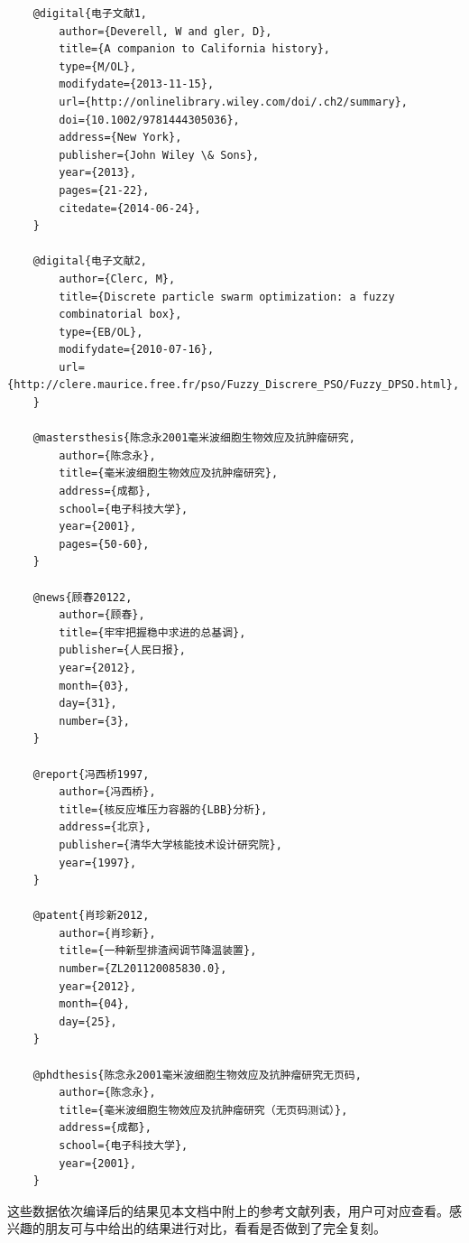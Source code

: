 \documentclass[print, doctor, vlined]{DissertUESTC}
\begin{document}
\begin{verbatim}
	@digital{电子文献1,
	    author={Deverell, W and gler, D},
	    title={A companion to California history},
	    type={M/OL},
	    modifydate={2013-11-15},
	    url={http://onlinelibrary.wiley.com/doi/.ch2/summary},
	    doi={10.1002/9781444305036},
	    address={New York},
	    publisher={John Wiley \& Sons},
	    year={2013},
	    pages={21-22},
	    citedate={2014-06-24},
	}
	
	@digital{电子文献2,
	    author={Clerc, M},
	    title={Discrete particle swarm optimization: a fuzzy
	    combinatorial box},
	    type={EB/OL},
	    modifydate={2010-07-16},
	    url={http://clere.maurice.free.fr/pso/Fuzzy_Discrere_PSO/Fuzzy_DPSO.html},
	}
	
	@mastersthesis{陈念永2001毫米波细胞生物效应及抗肿瘤研究,
	    author={陈念永},
	    title={毫米波细胞生物效应及抗肿瘤研究},
	    address={成都},
	    school={电子科技大学},
	    year={2001},
	    pages={50-60},
	}
	
	@news{顾春20122,
	    author={顾春},
	    title={牢牢把握稳中求进的总基调},
	    publisher={人民日报},
	    year={2012},
	    month={03},
	    day={31},
	    number={3},
	}
	
	@report{冯西桥1997,
	    author={冯西桥},
	    title={核反应堆压力容器的{LBB}分析},
	    address={北京},
	    publisher={清华大学核能技术设计研究院},
	    year={1997},
	}
	
	@patent{肖珍新2012,
	    author={肖珍新},
	    title={一种新型排渣阀调节降温装置},
	    number={ZL201120085830.0},
	    year={2012},
	    month={04},
	    day={25},
	}

	@phdthesis{陈念永2001毫米波细胞生物效应及抗肿瘤研究无页码,
	    author={陈念永},
	    title={毫米波细胞生物效应及抗肿瘤研究（无页码测试）},
	    address={成都},
	    school={电子科技大学},
	    year={2001},
	}
	\end{verbatim}
	
	这些数据依次编译后的结果见本文档中附上的参考文献列表，用户可对应查看。感兴趣的朋友可与\href{https://gr.uestc.edu.cn/xiazai/114/3917}{}中给出的结果进行对比，看看是否做到了完全复刻。
\end{document}
